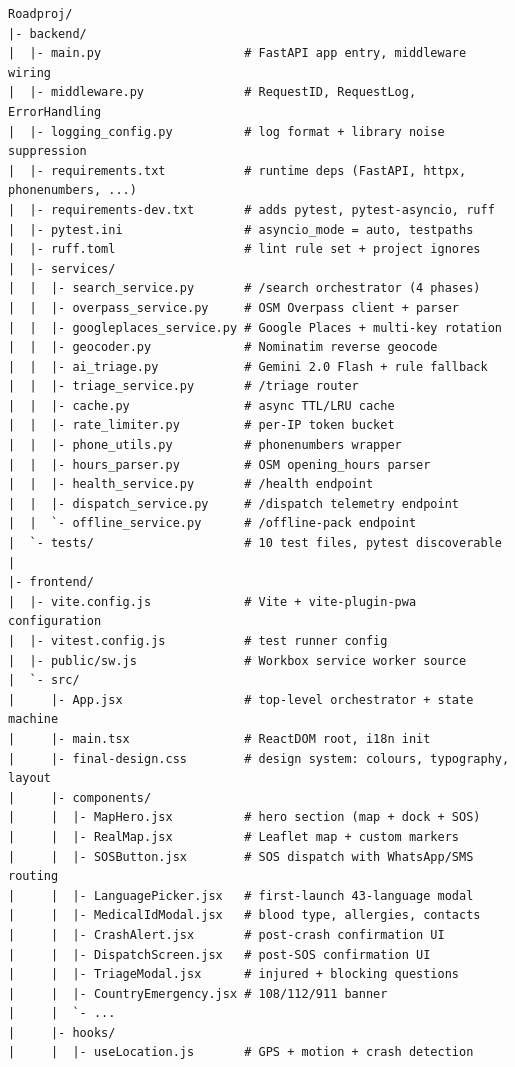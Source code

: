 \documentclass[11pt, a4paper]{article}
\begin{document}
\begin{lstlisting}[language={},numbers=none,frame=none]
Roadproj/
|- backend/
|  |- main.py                    # FastAPI app entry, middleware wiring
|  |- middleware.py              # RequestID, RequestLog, ErrorHandling
|  |- logging_config.py          # log format + library noise suppression
|  |- requirements.txt           # runtime deps (FastAPI, httpx, phonenumbers, ...)
|  |- requirements-dev.txt       # adds pytest, pytest-asyncio, ruff
|  |- pytest.ini                 # asyncio_mode = auto, testpaths
|  |- ruff.toml                  # lint rule set + project ignores
|  |- services/
|  |  |- search_service.py       # /search orchestrator (4 phases)
|  |  |- overpass_service.py     # OSM Overpass client + parser
|  |  |- googleplaces_service.py # Google Places + multi-key rotation
|  |  |- geocoder.py             # Nominatim reverse geocode
|  |  |- ai_triage.py            # Gemini 2.0 Flash + rule fallback
|  |  |- triage_service.py       # /triage router
|  |  |- cache.py                # async TTL/LRU cache
|  |  |- rate_limiter.py         # per-IP token bucket
|  |  |- phone_utils.py          # phonenumbers wrapper
|  |  |- hours_parser.py         # OSM opening_hours parser
|  |  |- health_service.py       # /health endpoint
|  |  |- dispatch_service.py     # /dispatch telemetry endpoint
|  |  `- offline_service.py      # /offline-pack endpoint
|  `- tests/                     # 10 test files, pytest discoverable
|
|- frontend/
|  |- vite.config.js             # Vite + vite-plugin-pwa configuration
|  |- vitest.config.js           # test runner config
|  |- public/sw.js               # Workbox service worker source
|  `- src/
|     |- App.jsx                 # top-level orchestrator + state machine
|     |- main.tsx                # ReactDOM root, i18n init
|     |- final-design.css        # design system: colours, typography, layout
|     |- components/
|     |  |- MapHero.jsx          # hero section (map + dock + SOS)
|     |  |- RealMap.jsx          # Leaflet map + custom markers
|     |  |- SOSButton.jsx        # SOS dispatch with WhatsApp/SMS routing
|     |  |- LanguagePicker.jsx   # first-launch 43-language modal
|     |  |- MedicalIdModal.jsx   # blood type, allergies, contacts
|     |  |- CrashAlert.jsx       # post-crash confirmation UI
|     |  |- DispatchScreen.jsx   # post-SOS confirmation UI
|     |  |- TriageModal.jsx      # injured + blocking questions
|     |  |- CountryEmergency.jsx # 108/112/911 banner
|     |  `- ...
|     |- hooks/
|     |  |- useLocation.js       # GPS + motion + crash detection

\end{lstlisting}
\end{document}
